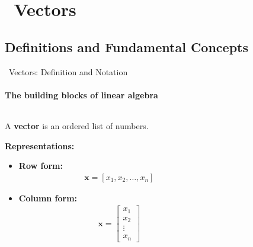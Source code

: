 \documentclass[12pt,aspectratio=169]{beamer}
\begin{document}
\section[Vectors]{\faArrowRight \, Vectors}
\subsection{Definitions and Fundamental Concepts}

\begin{frame}{\faArrowRight \, Vectors: Definition and Notation}
\framesubtitle{The building blocks of linear algebra}

\begin{columns}[T]
    \begin{column}{0.55\textwidth}
        \begin{definition}[Vector]
            A \textbf{vector} is an ordered list of numbers.
        \end{definition}
        
        \vspace{0.3cm}
        \textbf{Representations:}
        \begin{itemize}
            \item \textbf{Row form:} 
            \begin{align}
                \mathbf{x} = \left[ x_1, x_2, \ldots, x_n \right] \label{eq:row}
            \end{align}
            
            \item \textbf{Column form:} 
            \begin{align}
                \mathbf{x} = \begin{bmatrix}
                    x_1 \\
                    x_2 \\
                    \vdots \\
                    x_n
                \end{bmatrix} \label{eq:column}
            \end{align}
        \end{itemize}
    \end{column}
    
    \begin{column}{0.4\textwidth}
\end{column}
\end{columns}
\end{frame}
\end{document}
